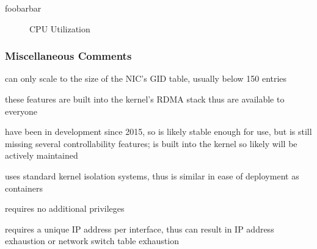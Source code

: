 \documentclass[12pt,titlepage]{article}
\begin{document}
foobarbar

\begin{figure}
	\centering
	\caption{CPU Utilization}%
	\label{fig:shared_hca_multi_vdev}
\end{figure}


\subsubsection*{Miscellaneous Comments}
\begin{description}[nolistsep,font={{\scshape\bfseries}}]
	\item[Scalability Limits] can only scale to the size of the NIC's GID table, usually below 150 entries
	\item[Proprietary] these features are built into the kernel's RDMA stack thus are available to everyone
	\item[Maturity] have been in development since 2015, so is likely stable enough for use, but is still missing several controllability features; is built into the kernel so likely will be actively maintained
	\item[Ease in Deployment] uses standard kernel isolation systems, thus is similar in ease of deployment as containers
	\item[Execution Privileges] requires no additional privileges
	\item[Network Pressure] requires a unique IP address per interface, thus can result in IP address exhaustion or network switch table exhaustion
\end{description}
\end{document}
